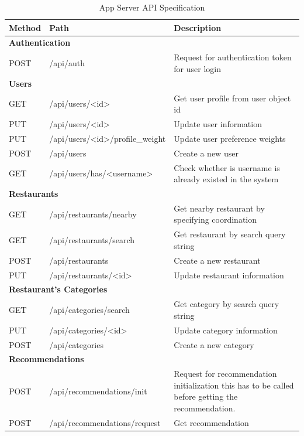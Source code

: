 \documentclass[12pt,oneside,openright,a4paper]{cpe-english-project}
\begin{document}
\begin{table}[H]
\caption{App Server API Specification}\label{tbl:4AppServerAPISpecification}
\begin{tabularx}{\textwidth}{l|l|X} \hline\hline
Method & Path & Description \\ \hline\hline
\multicolumn{3}{l}{\textbf{Authentication}} \\ \hline\hline
POST & /api/auth & Request for authentication token for user login\\ \hline\hline
\multicolumn{3}{l}{\textbf{Users}}\\ \hline\hline
GET & /api/users/<id> & Get user profile from user object id \\ \hline
PUT & /api/users/<id> & Update user information \\ \hline
PUT & /api/users/<id>/profile\_weight & Update user preference weights \\ \hline
POST & /api/users & Create a new user \\ \hline
GET & /api/users/has/<username> & Check whether is username is already existed in the system\\ \hline\hline
\multicolumn{3}{l}{\textbf{Restaurants}}\\ \hline\hline
GET & /api/restaurants/nearby & Get nearby restaurant by specifying coordination \\ \hline
GET & /api/restaurants/search & Get restaurant by search query string \\ \hline
POST & /api/restaurants & Create a new restaurant \\ \hline
PUT & /api/restaurants/<id> & Update restaurant information \\ \hline\hline
\multicolumn{3}{l}{\textbf{Restaurant’s Categories}}\\ \hline\hline
GET & /api/categories/search & Get category by search query string \\ \hline
PUT & /api/categories/<id> & Update category information \\ \hline
POST & /api/categories & Create a new category \\ \hline\hline
\multicolumn{3}{l}{\textbf{Recommendations}}\\ \hline\hline
POST & /api/recommendations/init & Request for recommendation initialization this has to be called before getting the recommendation. \\ \hline
POST & /api/recommendations/request & Get recommendation \\ \hline\hline
\end{tabularx}
\end{table}
\end{document}
